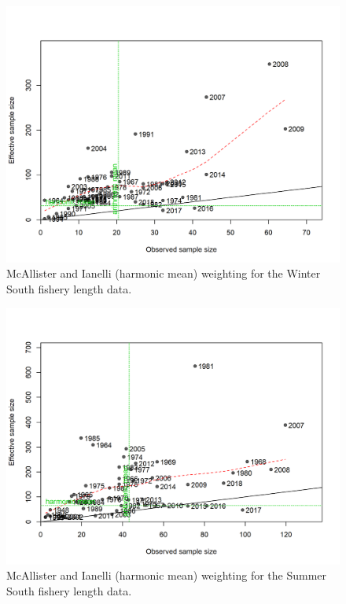 \documentclass[12pt,]{article}
\begin{document}
\FloatBarrier

\begin{figure}
\centering
\includegraphics{r4ss/plots_mod1/comp_lenfit_sampsize_flt3mkt2.png}
\caption{McAllister and Ianelli (harmonic mean) weighting for the Winter
South fishery length data. \label{fig:harm_mean_ws}}
\end{figure}

\FloatBarrier

\begin{figure}
\centering
\includegraphics{r4ss/plots_mod1/comp_lenfit_sampsize_flt4mkt2.png}
\caption{McAllister and Ianelli (harmonic mean) weighting for the Summer
South fishery length data. \label{fig:harm_mean_wn}}
\end{figure}
\end{document}
